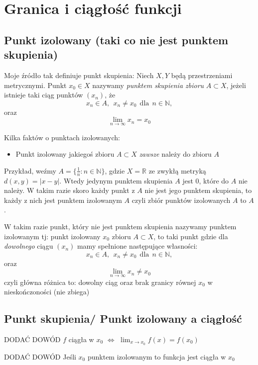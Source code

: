 \documentclass{article}
\begin{document}
\section{Granica i ciągłość funkcji}

\subsection{Punkt izolowany (taki co nie jest punktem skupienia)}

Moje źródło tak definiuje punkt skupienia: Niech \(X, Y\) będą przestrzeniami metrycznymi. Punkt \(x_0 \in X\) nazywamy
\emph{punktem skupienia zbioru} \(A \subset X\), jeżeli istnieje taki ciąg punktów \((x_n)\), że
\begin{equation*}
    x_n \in A, \ \ x_n \neq x_0 \ \ \mbox{dla} \ \ n \in \mathbb{N},
\end{equation*}
oraz
\begin{equation*}
    \lim_{n \to \infty} x_n = x_0
\end{equation*}

Kilka faktów o punktach izolowanych:
\begin{itemize}
    \item Punkt izolowany jakiegoś zbioru \(A \subset X\) \emph{zawsze} należy do zbioru \(A\)
\end{itemize}

Przykład, weźmy \(A = \{\frac{1}{n}: n \in \mathbb{N}\}\), gdzie \(X = \mathbb{R}\) ze zwykłą metryką \(d(x,y) = |x - y|\).
Wtedy jedynym punktem skupienia \(A\) jest \(0\), które do \(A\) nie należy. W takim razie skoro każdy punkt z \(A\)
nie jest jego punktem skupienia, to każdy z nich jest punktem izolowanym \(A\) czyli zbiór punktów izolowanych \(A\) to \(A\).

W takim razie punkt, który nie jest punktem skupienia nazywamy punktem izolowanym tj: punkt izolowany \(x_0\) zbioru \(A \subset X\), to taki punkt
gdzie dla \emph{dowolnego} ciągu \((x_n)\) mamy spełnione następujące własności:
\begin{equation*}
    x_n \in A, \ \ x_n \neq x_0 \ \ \mbox{dla} \ \ n \in \mathbb{N},
\end{equation*}
oraz
\begin{equation*}
    \lim_{n \to \infty} x_n \neq x_0
\end{equation*}
czyli główna różnica to: dowolny ciąg oraz brak granicy równej \(x_0\) w nieskończoności (nie zbiega)

\subsection{Punkt skupienia/ Punkt izolowany a ciągłość}
\begin{center}
    DODAĆ DOWÓD \(f\) ciągła w \(x_0\) \(\iff\) \(\lim_{x \to x_0} f(x) = f(x_0)\)
\end{center}
\begin{center}
    DODAĆ DOWÓD Jeśli \(x_0\) punktem izolowanym to funkcja jest ciągła w \(x_0\)
\end{center}
\end{document}
